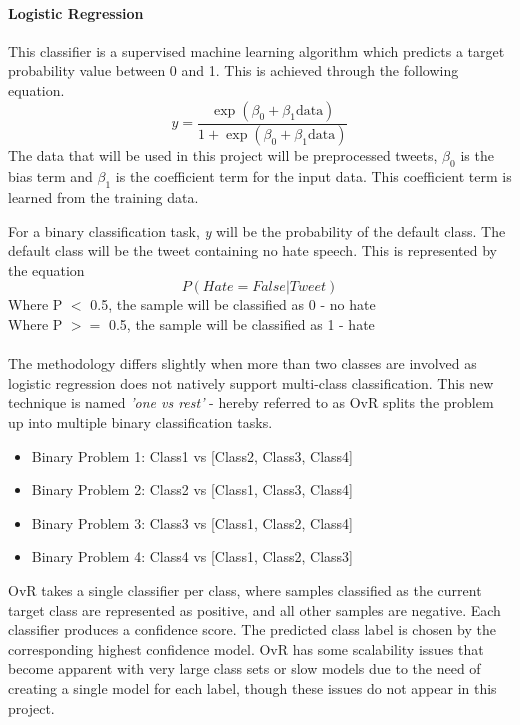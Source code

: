 \documentclass[conference]{IEEEtran}
\begin{document}
\paragraph{\textbf{Logistic Regression}} This classifier is a supervised machine learning algorithm which predicts a target probability value between 0 and 1. This is achieved through the following equation.
\[y = \frac{\exp(\beta_{0} + \beta_{1} \text{data})}{1 + \exp(\beta_{0} + \beta_{1} \text{data})}\]
The data that will be used in this project will be preprocessed tweets, $\beta_{0}$ is the bias term and $\beta_{1}$ is the coefficient term for the input data. This coefficient term is learned from the training data.

For a binary classification task, \textit{y} will be the probability of the default class. The default class will be the tweet containing no hate speech. This is represented by the equation \[ P(Hate=False | Tweet) \]
\noindent
Where P $<$ 0.5, the sample will be classified as 0 - no hate\\
Where P $>=$ 0.5, the sample will be classified as 1 - hate\\

\noindent
\\The methodology differs slightly when more than two classes are involved as logistic regression does not natively support multi-class classification. This new technique is named \textit{'one vs rest'} - hereby referred to as OvR splits the problem up into multiple binary classification tasks.\\
\begin{itemize}
  \item Binary Problem 1: Class1 vs [Class2, Class3, Class4]
  \item Binary Problem 2: Class2 vs [Class1, Class3, Class4]
  \item Binary Problem 3: Class3 vs [Class1, Class2, Class4]
  \item Binary Problem 4: Class4 vs [Class1, Class2, Class3]\\
\end{itemize}

OvR takes a single classifier per class, where samples classified as the current target class are represented as positive, and all other samples are negative\cite{4}. Each classifier produces a confidence score. The predicted class label is chosen by the corresponding highest confidence model. OvR has some scalability issues that become apparent with very large class sets or slow models due to the need of creating a single model for each label, though these issues do not appear in this project.\\
\end{document}
